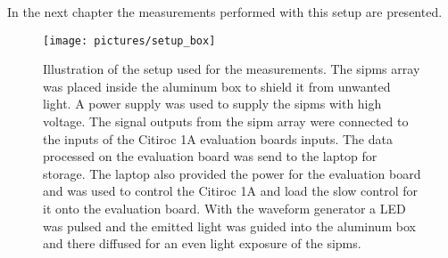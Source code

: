 In the next chapter the measurements performed with this setup are presented.


\begin{figure}
	\centering
	\texttt{[image: pictures/setup\_box]}
	\caption[Illustration of the measurement setup]{Illustration of the setup used for the measurements. The \acp{sipm} array was placed inside the aluminum box to shield it from unwanted light. A power supply was used to supply the \acp{sipm} with high voltage. The signal outputs from the \ac{sipm} array were connected to the inputs of the Citiroc 1A evaluation boards inputs. The data processed on the evaluation board was send to the laptop for storage. The laptop also provided the power for the evaluation board and was used to control the Citiroc 1A and load the slow control for it onto the evaluation board. With the waveform generator a LED was pulsed and the emitted light was guided into the aluminum box and there diffused for an even light exposure of the \acp{sipm}.}
	\label{fig:setup_inside_box}
\end{figure}
